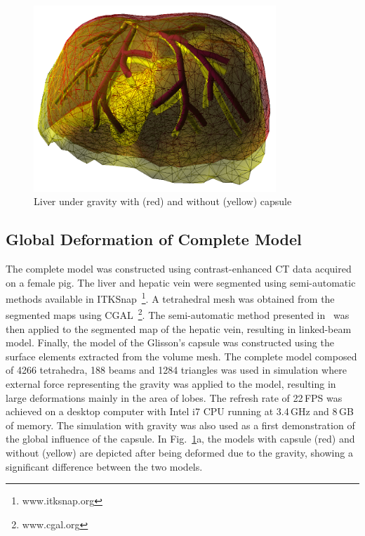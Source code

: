 

\begin{figure}[b]
  \centering
  \includegraphics[height=7cm]{figures/modelUnderGravity.png}
  \caption{Liver under gravity with (red) and without (yellow) capsule}
  \label{f:gravity}
\end{figure}


\subsection{Global Deformation of Complete Model}
The complete model was constructed using contrast-enhanced CT data acquired on a female pig.
The liver and hepatic vein were segmented using semi-automatic methods available in ITKSnap~\footnote{www.itksnap.org}.
A tetrahedral mesh was obtained from the segmented maps using CGAL~\footnote{www.cgal.org}.
The semi-automatic method presented in~\cite{Peterlik2012} was
then applied to the segmented map of the hepatic vein, resulting in linked-beam model.
Finally, the model of the Glisson's capsule was constructed using the surface elements extracted from the volume mesh.
The complete model composed of 4266 tetrahedra, 188 beams and 1284 triangles was 
used in simulation where external force representing the gravity was applied to the model,
resulting in large deformations mainly in the area of lobes. The refresh rate of 22\,FPS
was achieved on a desktop computer with Intel i7 CPU running at 3.4\,GHz and 8\,GB of memory.
The simulation with gravity was also used as a first demonstration of the global influence of the capsule.
In Fig.~\ref{f:gravity}a, the models with capsule (red) and without (yellow) are depicted after being
deformed due to the gravity, showing a significant difference between the two models.



